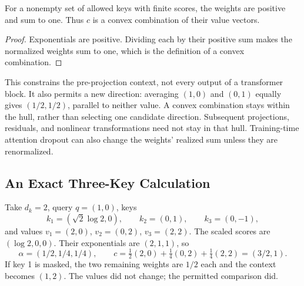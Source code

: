 \par\medskip\noindent\begin{minipage}{\linewidth}
\begin{theorem}
For a nonempty set of allowed keys with finite scores, the weights are positive and sum to one. Thus $c$ is a convex combination of their value vectors.
\end{theorem}
\begin{proof}
Exponentials are positive. Dividing each by their positive sum makes the normalized weights sum to one, which is the definition of a convex combination.
\end{proof}
\end{minipage}\par\medskip

This constrains the pre-projection context, not every output of a transformer block. It also permits a new direction: averaging $(1,0)$ and $(0,1)$ equally gives $(1/2,1/2)$, parallel to neither value. A convex combination stays within the hull, rather than selecting one candidate direction. Subsequent projections, residuals, and nonlinear transformations need not stay in that hull. Training-time attention dropout can also change the weights' realized sum unless they are renormalized.

\subsection{An Exact Three-Key Calculation}

Take $d_k=2$, query $q=(1,0)$, keys
\[
k_1=(\sqrt2\log2,0),\qquad k_2=(0,1),\qquad k_3=(0,-1),
\]
and values $v_1=(2,0)$, $v_2=(0,2)$, $v_3=(2,2)$. The scaled scores are $(\log2,0,0)$. Their exponentials are $(2,1,1)$, so
\[
\alpha=(1/2,1/4,1/4),\qquad
c=\tfrac12(2,0)+\tfrac14(0,2)+\tfrac14(2,2)=(3/2,1).
\]
If key 1 is masked, the two remaining weights are $1/2$ each and the context becomes $(1,2)$. The values did not change; the permitted comparison did.

\par\addvspace{\intextsep}\noindent\begin{minipage}{\linewidth}
\centering
{}
\label{fig:attention-weighted-average}
\end{minipage}\par\addvspace{\intextsep}

